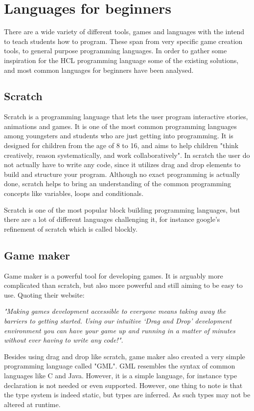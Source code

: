 \section{Languages for beginners}

There are a wide variety of different tools, games and languages with the intend to teach students how to program. 
These span from very specific game creation tools, to general purpose programming languages. 
In order to gather some inspiration for the HCL programming language some of the existing solutions, and most common languages for beginners have been analysed.

\subsection{Scratch}
\label{sec:scratch}
Scratch is a programming language that lets the user program interactive stories, animations and games. 
It is one of the most common programming languages among youngsters and students who are just getting into programming. 
It is designed for children from the age of 8 to 16, and aims to help children "think creatively, reason systematically, and work collaboratively". 
In scratch the user do not actually have to write any code, since it utilizes drag and drop elements to build and structure your program. Although no exact programming is actually done, scratch helps to bring an understanding of the common programming concepts like variables, loops and conditionals.\cite{ScratchWebsite}

Scratch is one of the most popular block building programming languages, but there are a lot of different languages challenging it, for instance google's refinement of scratch which is called blockly.\cite{Blockly}

\subsection{Game maker}
Game maker is a powerful tool for developing games. It is arguably more complicated than scratch, but also more powerful and still aiming to be easy to use. 
Quoting their website: 

\textit{"Making games development accessible to everyone means taking away the barriers to getting started. Using our intuitive ‘Drag and Drop’ development environment you can have your game up and running in a matter of minutes without ever having to write any code!".}\cite{GameMaker}
 
Besides using drag and drop like scratch, game maker also created a very simple programming language called "GML".
GML resembles the syntax of common languages like C and Java. 
However, it is a simple language, for instance type declaration is not needed or even supported. 
However, one thing to note is that the type system is indeed static, but types are inferred. 
As such types may not be altered at runtime.\cite{GML}

